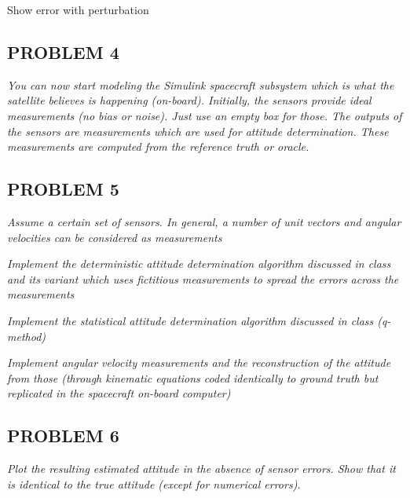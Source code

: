 Show error with perturbation

\subsection{PROBLEM 4}
\textit{You can now start modeling the Simulink spacecraft subsystem which is what the satellite believes is happening (on-board). Initially, the sensors provide ideal measurements (no bias or noise). Just use an empty box for those. The outputs of the sensors are measurements which are used for attitude determination. These measurements are computed from the reference truth or oracle.}

\subsection{PROBLEM 5}
\textit{Assume a certain set of sensors. In general, a number of unit vectors and angular velocities can be considered as measurements}

\textit{Implement the deterministic attitude determination algorithm discussed in class and its variant which uses fictitious measurements to spread the errors across the measurements}

\textit{Implement the statistical attitude determination algorithm discussed in class (q-method)}

\textit{Implement angular velocity measurements and the reconstruction of the attitude from those (through kinematic equations coded identically to ground truth but replicated in the spacecraft on-board computer)}

\subsection{PROBLEM 6}
\textit{Plot the resulting estimated attitude in the absence of sensor errors. Show that it is identical to the true attitude (except for numerical errors).}